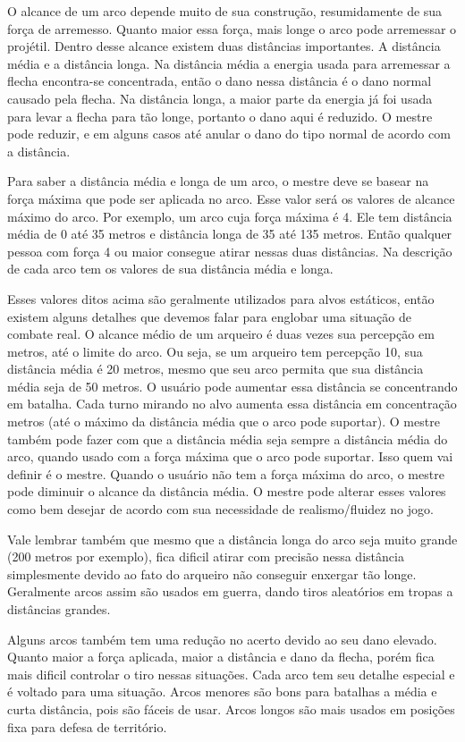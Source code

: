O alcance de um arco depende muito de sua construção, resumidamente de sua força de arremesso. Quanto maior essa força, mais longe o arco pode arremessar o projétil. Dentro desse alcance existem duas distâncias importantes. A distância média e a distância longa. Na distância média a energia usada para arremessar a flecha encontra-se concentrada, então o dano nessa distância é o dano normal causado pela flecha. Na distância longa, a maior parte da energia já foi usada para levar a flecha para tão longe, portanto o dano aqui é reduzido. O mestre pode reduzir, e em alguns casos até anular o dano do tipo normal de acordo com a distância. 

Para saber a distância média e longa de um arco, o mestre deve se basear na força máxima que pode ser aplicada no arco. Esse valor será os valores de alcance máximo do arco. Por exemplo, um arco cuja força máxima é 4. Ele tem distância média de 0 até 35 metros e distância longa de 35 até 135 metros. Então qualquer pessoa com força 4 ou maior consegue atirar nessas duas distâncias. Na descrição de cada arco tem os valores de sua distância média e longa.

Esses valores ditos acima são geralmente utilizados para alvos estáticos, então existem alguns detalhes que devemos falar para englobar uma situação de combate real. O alcance médio de um arqueiro é duas vezes sua percepção em metros, até o limite do arco. Ou seja, se um arqueiro tem percepção 10, sua distância média é 20 metros, mesmo que seu arco permita que sua distância média seja de 50 metros. O usuário pode aumentar essa distância se concentrando em batalha. Cada turno mirando no alvo aumenta essa distância em concentração metros (até o máximo da distância média que o arco pode suportar). O mestre também pode fazer com que a distância média seja sempre a distância média do arco, quando usado com a força máxima que o arco pode suportar. Isso quem vai definir é o mestre. Quando o usuário não tem a força máxima do arco, o mestre pode diminuir o alcance da distância média. O mestre pode alterar esses valores como bem desejar de acordo com sua necessidade de realismo/fluidez no jogo. 

Vale lembrar também que mesmo que a distância longa do arco seja muito grande (200 metros por exemplo), fica dificil atirar com precisão nessa distância simplesmente devido ao fato do arqueiro não conseguir enxergar tão longe. Geralmente arcos assim são usados em guerra, dando tiros aleatórios em tropas a distâncias grandes.

Alguns arcos também tem uma redução no acerto devido ao seu dano elevado. Quanto maior a força aplicada, maior a distância e dano da flecha, porém fica mais dificil controlar o tiro nessas situações. Cada arco tem seu detalhe especial e é voltado para uma situação. Arcos menores são bons para batalhas a média e curta distância, pois são fáceis de usar. Arcos longos são mais usados em posições fixa para defesa de território.

